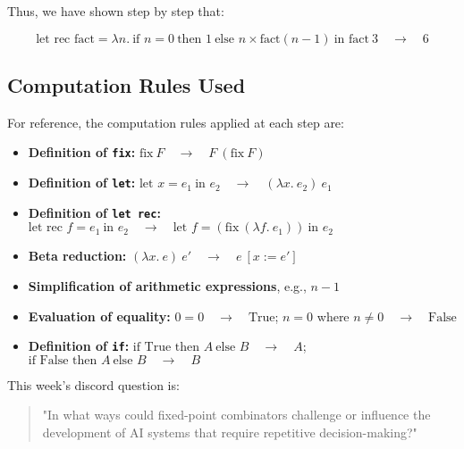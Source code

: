 \documentclass{article}
\begin{document}
Thus, we have shown step by step that:

\begin{equation*}
\text{let rec }\text{fact} = \lambda n.\ \text{if } n = 0\ \text{then } 1\ \text{else } n \times \text{fact}(n - 1)\ \text{in }\text{fact}\ 3\quad \to\quad 6
\end{equation*}

\subsection*{Computation Rules Used}

For reference, the computation rules applied at each step are:

\begin{itemize}
    \item \textbf{Definition of \texttt{fix}:} $\text{fix}\ F\quad \to\quad F\ (\text{fix}\ F)$
    \item \textbf{Definition of \texttt{let}:} $\text{let } x = e_1\ \text{in } e_2\quad \to\quad (\lambda x.\ e_2)\ e_1$
    \item \textbf{Definition of \texttt{let rec}:} $\text{let rec } f = e_1\ \text{in } e_2\quad \to\quad \text{let } f = (\text{fix}\ (\lambda f.\ e_1))\ \text{in } e_2$
    \item \textbf{Beta reduction:} $(\lambda x.\ e)\ e'\quad \to\quad e\ [x := e']$
    \item \textbf{Simplification of arithmetic expressions}, e.g., $n - 1$
    \item \textbf{Evaluation of equality:} $0 = 0\quad \to\quad \text{True}$; $n = 0$ where $n \neq 0\quad \to\quad \text{False}$
    \item \textbf{Definition of \texttt{if}:} $\text{if True then } A\ \text{else } B\quad \to\quad A$; $\text{if False then } A\ \text{else } B\quad \to\quad B$
\end{itemize}

This week's discord question is:

\begin{quote}
\small
"In what ways could fixed-point combinators challenge or influence the development of AI systems that require repetitive decision-making?"
\end{quote}

    
\end{document}
